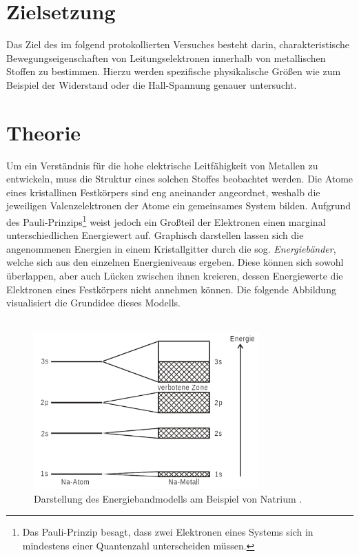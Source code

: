 


\section{Zielsetzung}

Das Ziel des im folgend protokollierten Versuches besteht darin, charakteristische Bewegungseigenschaften
von Leitungselektronen innerhalb von metallischen Stoffen zu bestimmen. Hierzu werden spezifische physikalische
Größen wie zum Beispiel der Widerstand oder die Hall-Spannung genauer untersucht.

\section{Theorie}
\label{sec:Theorie}

Um ein Verständnis für die hohe elektrische Leitfähigkeit von Metallen zu entwickeln, muss die Struktur eines solchen 
Stoffes beobachtet werden. Die Atome eines kristallinen Festkörpers sind eng aneinander angeordnet, weshalb die jeweiligen
Valenzelektronen der Atome ein gemeinsames System bilden. Aufgrund des Pauli-Prinzips\footnote{Das Pauli-Prinzip besagt, 
dass zwei Elektronen eines Systems sich in mindestens einer Quantenzahl unterscheiden müssen.} weist jedoch ein Großteil 
der Elektronen einen marginal unterschiedlichen Energiewert auf. Graphisch darstellen lassen sich die angenommenen Energien 
in einem Kristallgitter durch die sog. \emph{Energiebänder}, welche sich aus den einzelnen Energieniveaus ergeben. Diese 
können sich sowohl überlappen, aber auch Lücken zwischen ihnen kreieren, dessen Energiewerte die Elektronen eines Festkörpers 
nicht annehmen können. Die folgende Abbildung visualisiert die Grundidee dieses Modells.\\\\

\begin{figure}[H]
    \centering
    \includegraphics[height=6cm]{Energiebandmodell.png}
    \caption{Darstellung des Energiebandmodells am Beispiel von Natrium \cite{Versuchsanleitung_v511}.}
    \label{fig:Energiebandmodell}
\end{figure}

